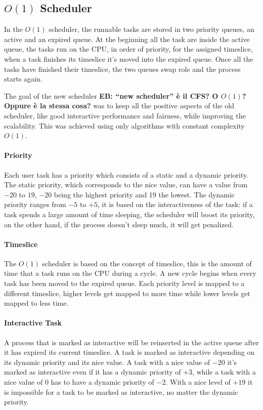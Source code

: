 \documentclass[10pt, oneside]{book}
\newcommand{\mycomment}[1]{\textbf{#1}}  %
\begin{document}
\subsection{$O(1)$ Scheduler}
In the $O(1)$ scheduler, the runnable tasks are stored in two priority queues, an active and an expired queue. At the beginning all the task are inside the active queue, the tasks run on the CPU, in order of priority, for the assigned timeslice, when a task finishes its timeslice it's moved into the expired queue. Once all the tasks have finished their timeslice, the two queues swap role and the process starts again.

The goal of the new scheduler \mycomment{EB: ``new scheduler'' \`e il CFS? O $O(1)$? Oppure \`e la stessa cosa?} was to keep all the positive aspects of the old scheduler, like good interactive performance and fairness, while improving the scalability. This was achieved using only algorithms with constant complexity $O(1)$.

\paragraph{Priority} %
Each user task has a priority which consists of a static and a dynamic priority. The static priority, which corresponds to the nice value, can have a value from $-20$ to $19$, $-20$ being the highest priority and 19 the lowest. The dynamic priority ranges from $-5$ to $+5$, it is based on the interactiveness of the task: if a task spends a large amount of time sleeping, the scheduler will boost its priority, on the other hand, if the process doesn't sleep much, it will get penalized.

\paragraph{Timeslice} %
The $O(1)$ scheduler is based on the concept of timeslice, this is the amount of time that a task runs on the CPU during a cycle. A new cycle begins when every task has been moved to the expired queue.  Each priority level is mapped to a different timeslice, higher levels get mapped to more time while lower levels get mapped to less time. 

\paragraph{Interactive Task}
A process that is marked as interactive will be reinserted in the
active queue after it has expired its current timeslice. A task is
marked as interactive depending on its dynamic priority and its nice
value. A task with a nice value of $-20$ it's marked as interactive
even if it has a dynamic priority of $+3$, while a task with a nice
value of $0$ has to have a dynamic priority of $-2$. With a nice level
of $+19$ it is impossible for a task to be marked as interactive, no
matter the dynamic priority.
\end{document}

